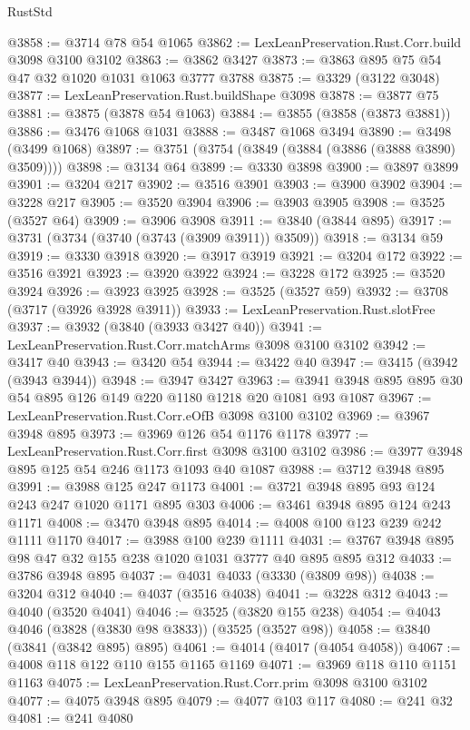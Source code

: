 \begin{lexlean}{RustStd}
\begin{coremodule}
@3858 := @3714 @78 @54 @1065
@3862 := LexLeanPreservation.Rust.Corr.build @3098 @3100 @3102
@3863 := @3862 @3427
@3873 := @3863 @895 @75 @54 @47 @32 @1020 @1031 @1063 @3777 @3788
@3875 := @3329 (@3122 @3048)
@3877 := LexLeanPreservation.Rust.buildShape @3098
@3878 := @3877 @75
@3881 := @3875 (@3878 @54 @1063)
@3884 := @3855 (@3858 (@3873 @3881))
@3886 := @3476 @1068 @1031
@3888 := @3487 @1068 @3494
@3890 := @3498 (@3499 @1068)
@3897 := @3751 (@3754 (@3849 (@3884 (@3886 (@3888 @3890) @3509))))
@3898 := @3134 @64
@3899 := @3330 @3898
@3900 := @3897 @3899
@3901 := @3204 @217
@3902 := @3516 @3901
@3903 := @3900 @3902
@3904 := @3228 @217
@3905 := @3520 @3904
@3906 := @3903 @3905
@3908 := @3525 (@3527 @64)
@3909 := @3906 @3908
@3911 := @3840 (@3844 @895)
@3917 := @3731 (@3734 (@3740 (@3743 (@3909 @3911)) @3509))
@3918 := @3134 @59
@3919 := @3330 @3918
@3920 := @3917 @3919
@3921 := @3204 @172
@3922 := @3516 @3921
@3923 := @3920 @3922
@3924 := @3228 @172
@3925 := @3520 @3924
@3926 := @3923 @3925
@3928 := @3525 (@3527 @59)
@3932 := @3708 (@3717 (@3926 @3928 @3911))
@3933 := LexLeanPreservation.Rust.slotFree
@3937 := @3932 (@3840 (@3933 @3427 @40))
@3941 := LexLeanPreservation.Rust.Corr.matchArms @3098 @3100 @3102
@3942 := @3417 @40
@3943 := @3420 @54
@3944 := @3422 @40
@3947 := @3415 (@3942 (@3943 @3944))
@3948 := @3947 @3427
@3963 := @3941 @3948 @895 @895 @30 @54 @895 @126 @149 @220 @1180 @1218 @20 @1081 @93 @1087
@3967 := LexLeanPreservation.Rust.Corr.eOfB @3098 @3100 @3102
@3969 := @3967 @3948 @895
@3973 := @3969 @126 @54 @1176 @1178
@3977 := LexLeanPreservation.Rust.Corr.first @3098 @3100 @3102
@3986 := @3977 @3948 @895 @125 @54 @246 @1173 @1093 @40 @1087
@3988 := @3712 @3948 @895
@3991 := @3988 @125 @247 @1173
@4001 := @3721 @3948 @895 @93 @124 @243 @247 @1020 @1171 @895 @303
@4006 := @3461 @3948 @895 @124 @243 @1171
@4008 := @3470 @3948 @895
@4014 := @4008 @100 @123 @239 @242 @1111 @1170
@4017 := @3988 @100 @239 @1111
@4031 := @3767 @3948 @895 @98 @47 @32 @155 @238 @1020 @1031 @3777 @40 @895 @895 @312
@4033 := @3786 @3948 @895
@4037 := @4031 @4033 (@3330 (@3809 @98))
@4038 := @3204 @312
@4040 := @4037 (@3516 @4038)
@4041 := @3228 @312
@4043 := @4040 (@3520 @4041)
@4046 := @3525 (@3820 @155 @238)
@4054 := @4043 @4046 (@3828 (@3830 @98 @3833)) (@3525 (@3527 @98))
@4058 := @3840 (@3841 (@3842 @895) @895)
@4061 := @4014 (@4017 (@4054 @4058))
@4067 := @4008 @118 @122 @110 @155 @1165 @1169
@4071 := @3969 @118 @110 @1151 @1163
@4075 := LexLeanPreservation.Rust.Corr.prim @3098 @3100 @3102
@4077 := @4075 @3948 @895
@4079 := @4077 @103 @117
@4080 := @241 @32
@4081 := @241 @4080

\end{coremodule}
\end{lexlean}

